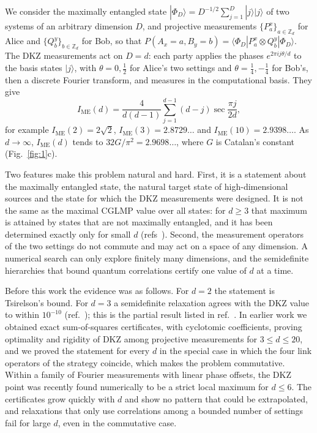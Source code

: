 \documentclass[11pt]{article}
\newcommand{\Z}{\mathbb{Z}}
\newcommand{\IME}{I_{\mathrm{ME}}}
\begin{document}
We consider the maximally entangled state $|\Phi_D\rangle=D^{-1/2}\sum_{j=1}^{D}|j\rangle|j\rangle$ of two systems
of an arbitrary dimension $D$, and projective measurements $\{P^x_a\}_{a\in\Z_d}$ for Alice and $\{Q^y_b\}_{b\in\Z_d}$
for Bob, so that $P(A_x=a,B_y=b)=\langle\Phi_D|P^x_a\otimes Q^y_b|\Phi_D\rangle$. The DKZ measurements act on
$D=d$: each party applies the phases $e^{2\pi ij\theta/d}$ to the basis states $|j\rangle$, with $\theta=0,\frac12$ for
Alice's two settings and $\theta=\frac14,-\frac14$ for Bob's, then a discrete Fourier transform, and measures in the
computational basis. They give\cite{DKZ2001,CGLMP2002}
\begin{equation}\label{eq:IME}
\IME(d)=\frac{4}{d(d-1)}\sum_{j=1}^{d-1}(d-j)\sec\frac{\pi j}{2d},
\end{equation}
for example $\IME(2)=2\sqrt2$, $\IME(3)=2.8729\ldots$ and $\IME(10)=2.9398\ldots$. As $d\to\infty$, $\IME(d)$
tends to $32G/\pi^2=2.9698\ldots$, where $G$ is Catalan's constant (Fig.~\ref{fig:1}c).

Two features make this problem natural and hard. First, it is a statement about the maximally entangled state, the
natural target state of high-dimensional sources and the state for which the DKZ measurements were designed. It is not
the same as
the maximal CGLMP value over all states: for $d\ge3$ that maximum is attained by states that are not maximally
entangled\cite{ADGL2002,MethotScarani2007,ZohrenGill2008}, and it has been determined exactly only for small $d$
(refs~). Second, the measurement operators of the two settings do not commute and
may act on a space of any dimension. A numerical search can only explore finitely many dimensions, and the
semidefinite hierarchies that bound quantum correlations\cite{NPA2008} certify one value of $d$ at a time.

Before this work the evidence was as follows. For $d=2$ the statement is Tsirelson's bound. For $d=3$ a semidefinite
relaxation agrees with the DKZ value to within $10^{-10}$ (ref.~); this is the partial result listed
in ref.~. In earlier work we obtained exact sum-of-squares certificates, with cyclotomic coefficients,
proving optimality and rigidity of DKZ among projective measurements for $3\le d\le20$\cite{repoCGLMP}, and we proved
the statement for every $d$ in the special case in which the four link operators of the strategy coincide, which makes
the problem commutative\cite{classical2026}. Within a family of Fourier measurements with linear phase offsets, the
DKZ point was recently found numerically to be a strict local maximum for $d\le6$\cite{TMMD2026}. The certificates grow
quickly with $d$ and show no pattern that could be extrapolated, and relaxations that only use correlations among a
bounded number of settings fail for large $d$, even in the commutative case\cite{classical2026}.
\end{document}
